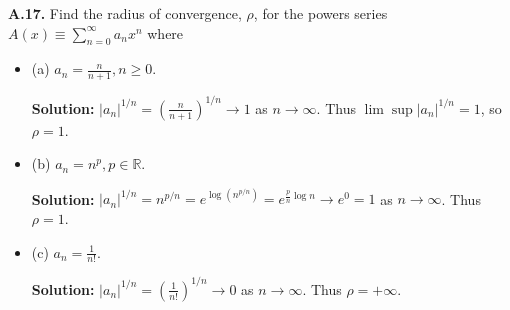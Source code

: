 \documentclass[12pt]{article}
\begin{document}
{\bf A.17.} Find the radius of convergence, $\rho$, for the powers series $A(x)
\equiv \sum_{n=0}^{\infty}a_{n}x^{n}$ where 
\begin{itemize}[label={},leftmargin=4mm, itemsep=1em, parsep=1em]
  \item (a) $a_{n} = \frac{n}{n+1}, n \geq 0$.

  {\bf Solution:} $|a_{n}|^{1/n} = \left(\frac{n}{n+1}\right)^{1/n}\rightarrow
  1$ as $n\rightarrow \infty$. Thus $\lim\sup |a_{n}|^{1/n} = 1$, so $\rho = 1$.

  \item (b) $a_{n} = n^{p}, p \in \mathbb{R}$.

  {\bf Solution:} $|a_{n}|^{1/n} = n^{p/n} = e^{\log(n^{p/n})} =
  e^{\frac{p}{n}\log n} \rightarrow e^{0} = 1$ as $n\rightarrow \infty$. Thus
  $\rho = 1$.

  \item (c) $a_{n} = \frac{1}{n!}$.

  {\bf Solution:} $|a_{n}|^{1/n} = \left(\frac{1}{n!}\right)^{1/n}\rightarrow 0$
  as $n\rightarrow \infty$. Thus $\rho = +\infty$.
\end{itemize}
\end{document}
